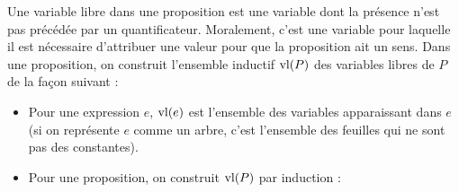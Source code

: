 \begin{defi}
    Une variable libre dans une proposition est une variable dont la présence n'est pas précédée par un quantificateur. Moralement, c'est une variable pour laquelle il est nécessaire d'attribuer une valeur pour que la proposition ait un sens.
    Dans une proposition, on construit l'ensemble inductif $\varlib{P}$ des variables libres de $P$ de la façon suivant :
    \begin{itemize}[label=$\bullet$]
        \item Pour une expression $e$, $\varlib{e}$ est l'ensemble des variables apparaissant dans $e$ (si on représente $e$ comme un arbre, c'est l'ensemble des feuilles qui ne sont pas des constantes).
        \item Pour une proposition, on construit $\varlib{P}$ par induction :
        \begin{center}
            \begin{prooftree}
            \end{prooftree}
            \quad 
            \begin{prooftree}
            \end{prooftree}
            \quad
            \begin{prooftree}
            \end{prooftree}
            \quad
            \begin{prooftree}
            \end{prooftree}
            \\
            \vspace{0.5cm}
            \begin{prooftree}
            \end{prooftree}
            \quad
            \begin{prooftree}
            \end{prooftree}
            \quad
            \begin{prooftree}

\end{prooftree}
\end{center}
\end{itemize}
\end{defi}
